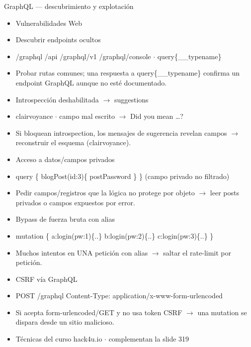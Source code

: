 \documentclass[aspectratio=169,10pt]{beamer}
\begin{document}
\begin{frame}[allowframebreaks]{GraphQL --- descubrimiento y explotación}
\small
  \begin{itemize}
  \item Vulnerabilidades Web
  \item Descubrir endpoints ocultos
  \item /graphql /api /graphql/v1 /graphql/console $\cdot$ query\{\_\_typename\}
  \item Probar rutas comunes; una respuesta a query\{\_\_typename\} confirma un endpoint GraphQL aunque no esté documentado.
  \item Introspección deshabilitada $\rightarrow$ suggestions
  \item clairvoyance $\cdot$ campo mal escrito $\rightarrow$ Did you mean \dots{}?
  \item Si bloquean introspection, los mensajes de sugerencia revelan campos $\rightarrow$ reconstruir el esquema (clairvoyance).
  \item Acceso a datos/campos privados
  \item query \{ blogPost(id:3)\{ postPassword \} \} (campo privado no filtrado)
  \item Pedir campos/registros que la lógica no protege por objeto $\rightarrow$ leer posts privados o campos expuestos por error.
  \item Bypass de fuerza bruta con alias
  \item mutation \{ a:login(pw:\textquotedbl{}1\textquotedbl{})\{..\} b:login(pw:\textquotedbl{}2\textquotedbl{})\{..\} c:login(pw:\textquotedbl{}3\textquotedbl{})\{..\} \}
  \item Muchos intentos en UNA petición con alias $\rightarrow$ saltar el rate-limit por petición.
  \item CSRF vía GraphQL
  \item POST /graphql Content-Type: application/x-www-form-urlencoded
  \item Si acepta form-urlencoded/GET y no usa token CSRF $\rightarrow$ una mutation se dispara desde un sitio malicioso.
  \item Técnicas del curso hack4u.io $\cdot$ complementan la slide 319
  \end{itemize}
\end{frame}
\end{document}
